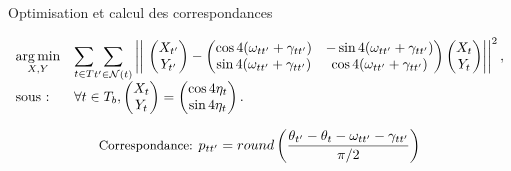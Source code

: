 \begin{frame}{Optimisation et calcul des correspondances}

    \scriptsize
    \begin{equation}
        \begin{array}{ll}
        \underset{X, Y}{\operatorname*{arg\,min}} & \underset{t \in T}{\displaystyle\sum} \underset{t' \in \mathcal{N}(t)}{\displaystyle\sum} \left|\left|\ \begin{pmatrix} X_{t'}\\ Y_{t'}\end{pmatrix} - \begin{pmatrix}\cos4(\omega_{tt'} + \gamma_{tt'}) & -\sin4(\omega_{tt'} + \gamma_{tt'}) \\ \sin4(\omega_{tt'} + \gamma_{tt'}) & \cos4(\omega_{tt'} + \gamma_{tt'}) \end{pmatrix} \begin{pmatrix} X_{t}\\ Y_{t}\end{pmatrix} \right|\right|^2, \\
        \text{sous : } & \forall t \in T_b, \begin{pmatrix} X_{t}\\ Y_{t}\end{pmatrix} = \begin{pmatrix} \cos4\eta_t\\ \sin4\eta_t\end{pmatrix}.
        \end{array}
        \label{eq:cadff_ff_2D_surface_optim}
    \end{equation}
    
    \[\small
    \text{Correspondance: } p_{tt'} = round\left(\frac{\theta_{t'} - \theta_t - \omega_{tt'} - \gamma_{tt'}}{\pi/2}\right)
    \]
    
    
\end{frame}